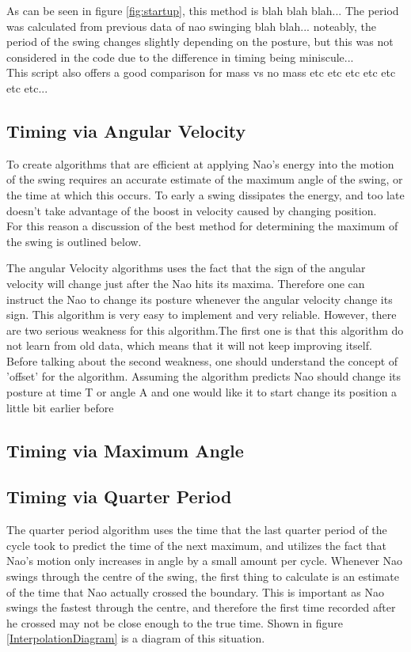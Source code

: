 \documentclass[11pt]{article}
\newcommand*\ruleline[1]{\par\noindent\raisebox{.8ex}{\makebox[\linewidth]{\hrulefill\hspace{1ex}\raisebox{-.8ex}{#1}\hspace{1ex}\hrulefill}}}
\begin{document}
As can be seen in figure \ref{fig:startup}, this method is blah blah blah... The period was calculated from previous data of nao swinging blah blah... noteably, the period of the swing changes slightly depending on the posture, but this was not considered in the code due to the difference in timing being miniscule... \\

This script also offers a good comparison for mass vs no mass etc etc etc etc etc etc etc...



\subsection{Timing via Angular Velocity}
\ruleline{George Sheppard}
To create algorithms that are efficient at applying Nao's energy into the motion of the swing requires an accurate estimate of the maximum angle of the swing, or the time at which this occurs. To early a swing dissipates the energy, and too late doesn't take advantage of the boost in velocity caused by changing position.\\
For this reason a discussion of the best method for determining the maximum of the swing is outlined below.

\ruleline{Chenglong Li}
The angular Velocity algorithms uses the fact that the sign of the angular velocity will change just after the Nao hits its maxima. Therefore one can instruct the Nao to change its posture whenever the angular velocity change its sign. This algorithm is very easy to implement and very reliable. However, there are two serious weakness for this algorithm.The first one is that this algorithm do not learn from old data, which means that it will not keep improving itself. Before talking about the second weakness, one should understand the concept of 'offset' for the algorithm. Assuming the algorithm predicts Nao should change its posture at time T or angle A and one would like it to start change its position a little bit earlier before  

\subsection{Timing via Maximum Angle}
\subsection{Timing via Quarter Period}
\ruleline{George Sheppard}
The quarter period algorithm uses the time that the last quarter period of the cycle took to predict the time of the next maximum, and utilizes the fact that Nao's motion only increases in angle by a small amount per cycle. Whenever Nao swings through the centre of the swing, the first thing to calculate is an estimate of the time that Nao actually crossed the boundary. This is important as Nao swings the fastest through the centre, and therefore the first time recorded after he crossed may not be close enough to the true time. Shown in figure \ref{InterpolationDiagram} is a diagram of this situation. 
\end{document}
